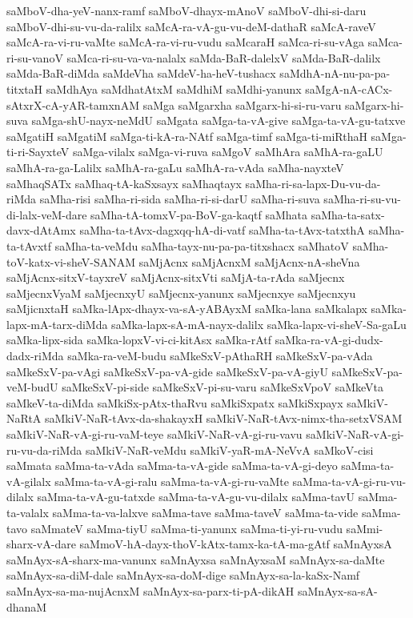 {saMboV-dha-yeV-nanx-ramf
saMboV-dhayx-mAnoV
saMboV-dhi-si-daru
saMboV-dhi-su-vu-da-ralilx
saMcA-ra-vA-gu-vu-deM-dathaR
saMcA-raveV
saMcA-ra-vi-ru-vaMte
saMcA-ra-vi-ru-vudu
saMcaraH
saMca-ri-su-vAga
saMca-ri-su-vanoV
saMca-ri-su-va-va-nalalx
saMda-BaR-dalelxV
saMda-BaR-dalilx
saMda-BaR-diMda
saMdeVha
saMdeV-ha-heV-tushacx
saMdhA-nA-nu-pa-pa-titxtaH
saMdhAya
saMdhatAtxM
saMdhiM
saMdhi-yanunx
saMgA-nA-cACx-sAtxrX-cA-yAR-tamxnAM
saMga
saMgarxha
saMgarx-hi-si-ru-varu
saMgarx-hi-suva
saMga-shU-nayx-neMdU
saMgata
saMga-ta-vA-give
saMga-ta-vA-gu-tatxve
saMgatiH
saMgatiM
saMga-ti-kA-ra-NAtf
saMga-timf
saMga-ti-miRthaH
saMga-ti-ri-SayxteV
saMga-vilalx
saMga-vi-ruva
saMgoV
saMhAra
saMhA-ra-gaLU
saMhA-ra-ga-Lalilx
saMhA-ra-gaLu
saMhA-ra-vAda
saMha-nayxteV
saMhaqSATx
saMhaq-tA-kaSxsayx
saMhaqtayx
saMha-ri-sa-lapx-Du-vu-da-riMda
saMha-risi
saMha-ri-sida
saMha-ri-si-darU
saMha-ri-suva
saMha-ri-su-vu-di-lalx-veM-dare
saMha-tA-tomxV-pa-BoV-ga-kaqtf
saMhata
saMha-ta-satx-davx-dAtAmx
saMha-ta-tAvx-dagxqq-hA-di-vatf
saMha-ta-tAvx-tatxthA
saMha-ta-tAvxtf
saMha-ta-veMdu
saMha-tayx-nu-pa-pa-titxshacx
saMhatoV
saMha-toV-katx-vi-sheV-SANAM
saMjAcnx
saMjAcnxM
saMjAcnx-nA-sheVna
saMjAcnx-sitxV-tayxreV
saMjAcnx-sitxVti
saMjA-ta-rAda
saMjecnx
saMjecnxVyaM
saMjecnxyU
saMjecnx-yanunx
saMjecnxye
saMjecnxyu
saMjicnxtaH
saMka-lApx-dhayx-va-sA-yABAyxM
saMka-lana
saMkalapx
saMka-lapx-mA-tarx-diMda
saMka-lapx-sA-mA-nayx-dalilx
saMka-lapx-vi-sheV-Sa-gaLu
saMka-lipx-sida
saMka-lopxV-vi-ci-kitAsx
saMka-rAtf
saMka-ra-vA-gi-dudx-dadx-riMda
saMka-ra-veM-budu
saMkeSxV-pAthaRH
saMkeSxV-pa-vAda
saMkeSxV-pa-vAgi
saMkeSxV-pa-vA-gide
saMkeSxV-pa-vA-giyU
saMkeSxV-pa-veM-budU
saMkeSxV-pi-side
saMkeSxV-pi-su-varu
saMkeSxVpoV
saMkeVta
saMkeV-ta-diMda
saMkiSx-pAtx-thaRvu
saMkiSxpatx
saMkiSxpayx
saMkiV-NaRtA
saMkiV-NaR-tAvx-da-shakayxH
saMkiV-NaR-tAvx-nimx-tha-setxVSAM
saMkiV-NaR-vA-gi-ru-vaM-teye
saMkiV-NaR-vA-gi-ru-vavu
saMkiV-NaR-vA-gi-ru-vu-da-riMda
saMkiV-NaR-veMdu
saMkiV-yaR-mA-NeVvA
saMkoV-cisi
saMmata
saMma-ta-vAda
saMma-ta-vA-gide
saMma-ta-vA-gi-deyo
saMma-ta-vA-gilalx
saMma-ta-vA-gi-ralu
saMma-ta-vA-gi-ru-vaMte
saMma-ta-vA-gi-ru-vu-dilalx
saMma-ta-vA-gu-tatxde
saMma-ta-vA-gu-vu-dilalx
saMma-tavU
saMma-ta-valalx
saMma-ta-va-lalxve
saMma-tave
saMma-taveV
saMma-ta-vide
saMma-tavo
saMmateV
saMma-tiyU
saMma-ti-yanunx
saMma-ti-yi-ru-vudu
saMmi-sharx-vA-dare
saMmoV-hA-dayx-thoV-kAtx-tamx-ka-tA-ma-gAtf
saMnAyxsA
saMnAyx-sA-sharx-ma-vanunx
saMnAyxsa
saMnAyxsaM
saMnAyx-sa-daMte
saMnAyx-sa-diM-dale
saMnAyx-sa-doM-dige
saMnAyx-sa-la-kaSx-Namf
saMnAyx-sa-ma-nujAcnxM
saMnAyx-sa-parx-ti-pA-dikAH
saMnAyx-sa-sA-dhanaM
}
